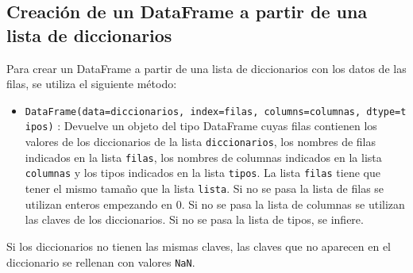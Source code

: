 \documentclass[
  spanish,
  a4paper,
]{scrreport}
\providecommand{\tightlist}{%
  \setlength{\itemsep}{0pt}\setlength{\parskip}{0pt}}
\begin{document}
\subsection{Creación de un DataFrame a partir de una lista de
diccionarios}\label{creaciuxf3n-de-un-dataframe-a-partir-de-una-lista-de-diccionarios}

Para crear un DataFrame a partir de una lista de diccionarios con los
datos de las filas, se utiliza el siguiente método:

\begin{itemize}
\tightlist
\item
  \texttt{DataFrame(data=diccionarios,\ index=filas,\ columns=columnas,\ dtype=tipos)}
  : Devuelve un objeto del tipo DataFrame cuyas filas contienen los
  valores de los diccionarios de la lista \texttt{diccionarios}, los
  nombres de filas indicados en la lista \texttt{filas}, los nombres de
  columnas indicados en la lista \texttt{columnas} y los tipos indicados
  en la lista \texttt{tipos}. La lista \texttt{filas} tiene que tener el
  mismo tamaño que la lista \texttt{lista}. Si no se pasa la lista de
  filas se utilizan enteros empezando en 0. Si no se pasa la lista de
  columnas se utilizan las claves de los diccionarios. Si no se pasa la
  lista de tipos, se infiere.
\end{itemize}

\begin{tcolorbox}[enhanced jigsaw, arc=.35mm, bottomrule=.15mm, bottomtitle=1mm, breakable, colback=white, colbacktitle=quarto-callout-warning-color!10!white, colframe=quarto-callout-warning-color-frame, coltitle=black, left=2mm, leftrule=.75mm, opacityback=0, opacitybacktitle=0.6, rightrule=.15mm, title=\textcolor{quarto-callout-warning-color}{\faExclamationTriangle}\hspace{0.5em}{Advertencia}, titlerule=0mm, toprule=.15mm, toptitle=1mm]

Si los diccionarios no tienen las mismas claves, las claves que no
aparecen en el diccionario se rellenan con valores \texttt{NaN}.

\end{tcolorbox}
\end{document}
